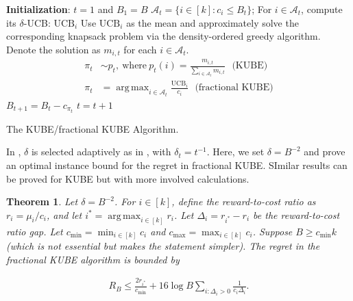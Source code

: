 \documentclass[10pt,a4article]{article}
\numberwithin{equation}{section}
\theoremstyle{plain}
\newtheorem{Th}{Theorem}[section]
\theoremstyle{definition}
\DeclareMathOperator*{\argmax}{arg\,max}
\begin{document}
\begin{algorithm}[H]
 \begin{algorithmic}[1]
 \STATE \textbf{Initialization}: $t=1$ and $B_1=B$
 \STATE $\mathcal A_t = \{i\in [k]: c_i\leq B_t\}$;
\STATE For $i\in\mathcal A_t$, compute its $\delta$-UCB: $\text{UCB}_i$ 
\STATE Use $\text{UCB}_i$ as the mean and approximately solve the corresponding knapsack problem via the density-ordered greedy algorithm. Denote the solution as $m_{i,t}$ for each $i\in\mathcal A_t$.\ \ \ 
\STATE \begin{align*}
\pi_t &\sim p_t,\ \text{where}\ p_t(i)=\frac{m_{i,t}}{\sum_{i\in\mathcal A_t}m_{i,t}}  \ \ \ \text{(KUBE)} \\
\pi_t &= \argmax_{i\in\mathcal A_t}\frac{\text{UCB}_i}{c_i} \ \ \ \text{(fractional KUBE)}
\end{align*}
\STATE $B_{t+1} = B_t-c_{\pi_t}$
\STATE $t = t+1$
\ENDWHILE
\end{algorithmic}
\caption{The KUBE/fractional KUBE Algorithm. } 
\label{alg:KUBE}
\end{algorithm}

In \cite{tran2012knapsack}, $\delta$ is selected adaptively as in \cite{auer2002finite}, with $\delta_t = t^{-1}$. Here, we set $\delta = B^{-2}$ and prove an optimal instance bound for the regret in fractional KUBE. SImilar results can be proved for KUBE but with more involved calculations. 

\begin{Th}\label{thm:KUBE}
Let $\delta=B^{-2}$. For $i\in [k]$, define the reward-to-cost ratio as $r_i=\mu_i/c_i$, and let $i^* = \argmax_{i\in [k]}r_i$. Let $\Delta_i = r_{i^*}-r_i$ be the reward-to-cost ratio gap. Let $c_{\min} = \min_{i\in [k]}c_i$ and $c_{\max} = \max_{i\in [k]}c_i$. Suppose $B\geq c_{\min}k$ (which is not essential but makes the statement simpler). The regret in the fractional KUBE algorithm is bounded by
\end{Th}
\begin{align*}
R_B\leq\frac{2r_{i^*}}{c_{\min}}+16\log B\sum_{i: \Delta_i>0}\frac{1}{c_i\Delta_i}.
\end{align*}
\end{document}

